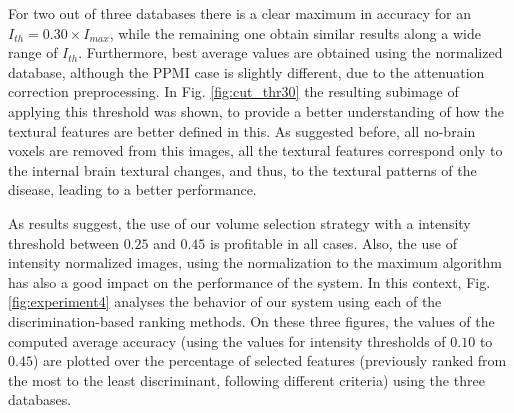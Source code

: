 For two out of three databases there is a clear maximum in accuracy for an $I_{th} = 0.30\times I_{max}$, while the remaining one obtain similar results along a wide range of $I_{th}$. Furthermore, best average values are obtained using the normalized database, although the PPMI case is slightly different, due to the attenuation correction preprocessing. In Fig. \ref{fig:cut_thr30} the resulting subimage of applying this threshold was shown, to provide a better understanding of how the textural features are better defined in this. As suggested before, all no-brain voxels are removed from this images, all the textural features correspond only to the internal brain textural changes, and thus, to the textural patterns of the disease, leading to a better performance. 

As results suggest, the use of our volume selection strategy with a intensity threshold between $0.25$ and $0.45$ is profitable in all cases. Also, the use of intensity normalized images, using the normalization to the maximum algorithm has also a good impact on the performance of the system. In this context, Fig. \ref{fig:experiment4} analyses the behavior of our system using each of the discrimination-based ranking methods. On these three figures, the values of the computed average accuracy (using the values for intensity thresholds of $0.10$ to $0.45$) are plotted over the percentage of selected features (previously ranked from the most to the least discriminant, following different criteria) using the three databases. 


